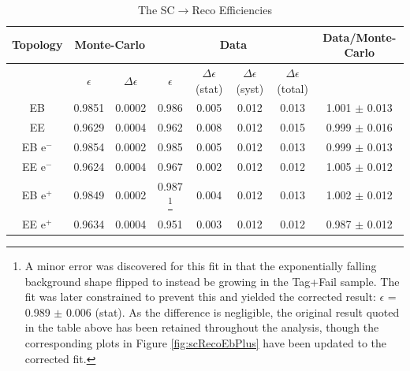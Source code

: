 \begin{table}
  \begin{center}
    \caption{The SC$\to$Reco Efficiencies}
    \label{tab:scRecoResults}
    \vskip 2mm
    \begin{minipage}{15cm}
    \begin{tabular}{c|cc|cccc|c}\hline \hline
      Topology &   \multicolumn{2}{c|}{Monte-Carlo} & \multicolumn{4}{c|}{Data} & Data/Monte-Carlo \\ \hline
               &   $\epsilon$ &  $\Delta\epsilon$  & $\epsilon$ & $\Delta\epsilon$ (stat) & $\Delta\epsilon$ (syst) & $\Delta\epsilon$ (total) &   \\ \hline
       EB      &   0.9851     & 0.0002             & 0.986      & 0.005                   & 0.012                   & 0.013                    & 1.001  $\pm$ 0.013 \\ 
       EE      &   0.9629     & 0.0004             & 0.962      & 0.008                   & 0.012                   & 0.015                    & 0.999  $\pm$ 0.016 \\
   EB e$^{-}$  &   0.9854     & 0.0002             & 0.985      & 0.005                   & 0.012                   & 0.013                    & 0.999  $\pm$ 0.013 \\
   EE e$^{-}$  &   0.9624     & 0.0004             & 0.967      & 0.002                   & 0.012                   & 0.012                    & 1.005  $\pm$ 0.012 \\
   EB e$^{+}$  &   0.9849     & 0.0002             & 0.987 \footnote[1]{
                                                                         A minor error was discovered for this fit in that the exponentially falling background shape flipped
									 to instead be growing in the Tag+Fail sample.  The fit was later constrained to prevent this and yielded the corrected result:
									 $\epsilon$ = 0.989 $\pm$ 0.006 (stat).  As the difference is negligible, the original result quoted in the table above has been 
									 retained throughout the analysis, though the corresponding plots in Figure \ref{fig:scRecoEbPlus}
									 have been updated to the corrected fit.}
                                                                & 0.004                   & 0.012                   & 0.013                    & 1.002  $\pm$ 0.012 \\
   EE e$^{+}$  &   0.9634     & 0.0004             & 0.951      & 0.003                   & 0.012                   & 0.012                    & 0.987  $\pm$ 0.012 \\ \hline

\end{tabular}
\end{minipage}
\end{center}
\end{table}

